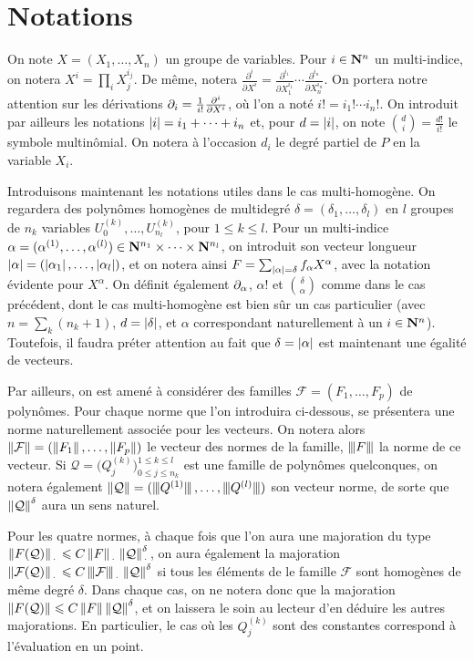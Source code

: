 \section{Notations}

On note $X = (X_1, \dots, X_n)$ un groupe de variables. Pour $i \in \mathbf{N}^n$ un
multi-indice, on notera $X^i = \prod_i X_j^{i_j}$. De même, notera
$\frac{\partial^i}{\partial X^i} = \frac{\partial^{i_1}}{\partial
  X_1^{i_1}}\cdots\frac{\partial^{i_n}}{\partial X_n^{i_n}}$. On portera notre
attention sur les dérivations $\partial_{i} = \frac1{i!}\frac{\partial^i}{\partial
  X^i}$, où l'on a noté $i! = i_1! \cdots i_n!$. On introduit par ailleurs les
notations $\left\lvert i\right\rvert = i_1 + \dots + i_n$ et, pour $d = \left\lvert i\right\rvert$, on note
$\binom{d}{i} = \frac{d!}{i!}$ le symbole multinômial. On notera à l'occasion
$d_i$ le degré partiel de $P$ en la variable $X_i$.

Introduisons maintenant les notations utiles dans le cas multi-homogène. On
regardera des polynômes homogènes de multidegré $\delta = (\delta_1, \dots,
\delta_l)$ en $l$ groupes de $n_k$ variables $U_0^{(k)}, \dots,
U_{n_l}^{(k)}$, pour $1\le k \le l$. Pour un multi-indice $\alpha =
(\alpha^{(1)}, \dots, \alpha^{(l)}) \in \mathbf{N}^{n_1} \times \dots \times
\mathbf{N}^{n_l}$, on introduit son vecteur longueur $\left\lvert\alpha\right\rvert =
(\left\lvert\alpha_1\right\rvert,\dots, \left\lvert\alpha_l\right\rvert)$, et on notera ainsi $F =
\sum_{\left\lvert\alpha\right\rvert = \delta} f_\alpha X^\alpha$, avec la notation évidente pour
$X^\alpha$. On définit également $\partial_{\alpha}$, $\alpha!$ et
$\binom{\delta}{\alpha}$ comme dans le cas précédent, dont le cas
multi-homogène est bien sûr un cas particulier (avec $n = \sum_k (n_k + 1)$,
$d = \left\lvert\delta\right\rvert$, et $\alpha$ correspondant naturellement à un $i \in \mathbf{N}^n$).
Toutefois, il faudra préter attention au fait que $\delta = \left\lvert\alpha\right\rvert$ est
maintenant une égalité de vecteurs.

Par ailleurs, on est amené à considérer des familles $\mathcal F = (F_1,
\dots, F_p)$ de polynômes. Pour chaque norme que l'on introduira ci-dessous,
se présentera une norme naturellement associée pour les vecteurs. On notera
alors $\left\lVert\mathcal F\right\rVert = (\left\lVert F_1\right\rVert, \ldots, \left\lVert F_p\right\rVert)$ le vecteur des
normes de la famille, $\left\lvert\hspace{-1pt}\left\lvert\hspace{-1pt} \left\lvert F\right\rvert \hspace{-1pt}\right\rvert\hspace{-1pt}\right\rvert$ la norme de ce vecteur. Si $\mathcal Q =
\big(Q_j^{(k)}\big)_{0 \le j \le n_k}^{1 \le k \le l}$ est une famille de
polynômes quelconques, on notera également $\left\lVert\mathcal Q\right\rVert =
(\left\lvert\hspace{-1pt}\left\lvert\hspace{-1pt} \left\lvert\smash{Q^{(1)}}\right\rvert \hspace{-1pt}\right\rvert\hspace{-1pt}\right\rvert, \ldots, \left\lvert\hspace{-1pt}\left\lvert\hspace{-1pt} \left\lvert\smash{Q^{(l)}}\right\rvert \hspace{-1pt}\right\rvert\hspace{-1pt}\right\rvert)$ son vecteur norme,
de sorte que $\left\lVert\mathcal Q\right\rVert ^\delta$ aura un sens naturel.

Pour les quatre normes, à chaque fois que l'on aura une majoration du type $\left\lVert F(\mathcal Q)\right\rVert_{\,\cdot\,} \leqslant C \left\lVert F\right\rVert _{\,\cdot\,} \left\lVert\mathcal Q\right\rVert_{\,\cdot\,}^\delta$, on aura également la majoration $\left\lVert\mathcal F(\mathcal Q)\right\rVert_{\,\cdot\,} \leqslant C \left\lvert\hspace{-1pt}\left\lvert\hspace{-1pt} \left\lvert\mathcal F\right\rvert \hspace{-1pt}\right\rvert\hspace{-1pt}\right\rvert_{\,\cdot\,} \left\lVert\mathcal Q\right\rVert^\delta$ si tous les éléments de le famille $\mathcal F$ sont homogènes de même degré $\delta$. Dans chaque cas, on ne notera donc que la majoration $\left\lVert F(\mathcal Q)\right\rVert \leqslant C \left\lVert F\right\rVert \left\lVert\mathcal Q\right\rVert^\delta$, et on laissera le soin au lecteur d'en déduire les autres majorations. En particulier, le cas où les $Q_j^{(k)}$ sont des constantes correspond à l'évaluation en un point.

